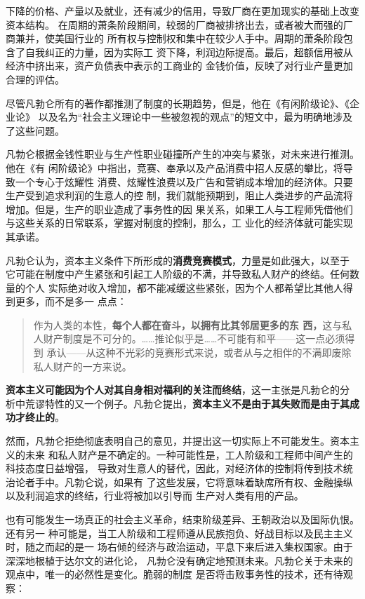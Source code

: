 下降的价格、产量以及就业，还有减少的信用，导致厂商在更加现实的基础上改变资本结构。
在周期的萧条阶段期间，较弱的厂商被排挤出去，或者被大而强的厂商兼并，使美国行业的
所有权与控制权和集中在较少人手中。周期的萧条阶段包含了自我纠正的力量，因为实际工
资下降，利润边际提高。最后，超额信用被从经济中挤出来，资产负债表中表示的工商业的
金钱价值，反映了对行业产量更加合理的评估。

尽管凡勃仑所有的著作都推测了制度的长期趋势，但是，他在《有闲阶级论》、《企业论》
以及名为“社会主义理论中一些被忽视的观点”的短文中，最为明确地涉及了这些问题。

凡勃仑根据金钱性职业与生产性职业碰撞所产生的冲突与紧张，对未来进行推测。他在《有
闲阶级论》中指出，竞赛、奉承以及产品消费中招人反感的攀比，将导致一个专心于炫耀性
消费、炫耀性浪费以及广告和营销成本增加的经济体。只要生产受到追求利润的生意人的控
制，我们就能预期到，阻止人类进步的产品流将增加。但是，生产的职业造成了事务性的因
果关系，如果工人与工程师凭借他们与这些关系的日常联系，掌握对制度的控制，那么，工
业化的经济体就可能实现其承诺。

凡勃仑认为，资本主义条件下所形成的\textbf{消费竞赛模式}，力量是如此强大，以至于
它可能在制度中产生紧张和引起工人阶级的不满，并导致私人财产的终结。任何数量的个人
实际绝对收入增加，都不能减缓这些紧张，因为个人都希望比其他人得到更多，而不是多一
点点：
\begin{quotation}作为人类的本性，\textbf{每个人都在奋斗，以拥有比其邻居更多的东
西，}这与私人财产制度是不可分的。……推论似乎是……不可能有和平——这一点必须得到
承认——从这种不光彩的竞赛形式来说，或者从与之相伴的不满即废除私人财产的一方来说。
\end{quotation}

\textbf{资本主义可能因为个人对其自身相对福利的关注而终结}，这一主张是凡勃仑的分
析中荒谬特性的又一个例子。凡勃仑提出，\textbf{资本主义不是由于其失败而是由于其成
功才终止的}。

然而，凡勃仑拒绝彻底表明自己的意见，并提出这一切实际上不可能发生。资本主义的未来
和私人财产是不确定的。一种可能性是，工人阶级和工程师中间产生的科技态度日益增强，
导致对生意人的替代，因此，对经济体的控制将传到技术统治论者手中。凡勃仑说，如果有
了这些发展，它将意味着缺席所有权、金融操纵以及利润追求的终结，行业将被加以引导而
生产对人类有用的产品。

也有可能发生一场真正的社会主义革命，结束阶级差异、王朝政治以及国际仇恨。还有另一
种可能是，当工人阶级和工程师遵从民族抱负、好战目标以及民主主义时，随之而起的是一
场右倾的经济与政治运动，平息下来后进入集权国家。由于深深地根植于达尔文的进化论，
凡勃仑没有确定地预测未来。凡勃仑关于未来的观点中，唯一的必然性是变化。脆弱的制度
是否将击败事务性的技术，还有待观察：

